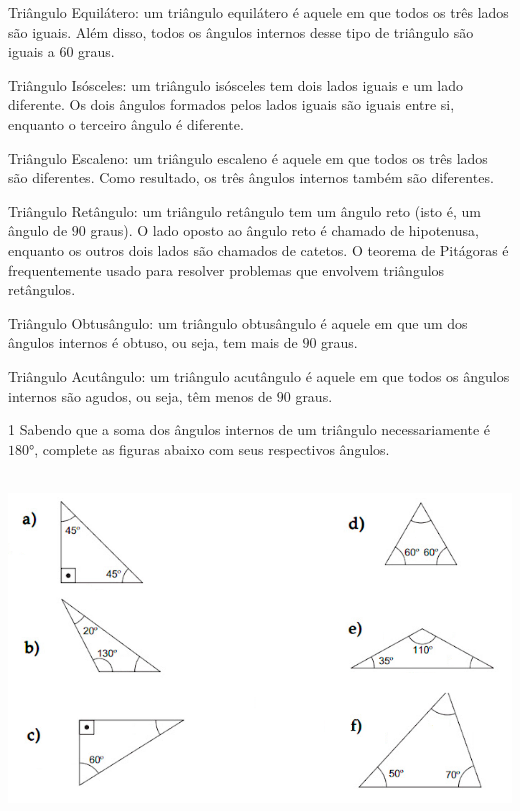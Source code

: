 Triângulo Equilátero: um triângulo equilátero é aquele em que todos os
três lados são iguais. Além disso, todos os ângulos internos desse tipo
de triângulo são iguais a $60$ graus.

Triângulo Isósceles: um triângulo isósceles tem dois lados iguais e um
lado diferente. Os dois ângulos formados pelos lados iguais são iguais
entre si, enquanto o terceiro ângulo é diferente.

Triângulo Escaleno: um triângulo escaleno é aquele em que todos os três
lados são diferentes. Como resultado, os três ângulos internos também
são diferentes.

Triângulo Retângulo: um triângulo retângulo tem um ângulo reto (isto é,
um ângulo de $90$ graus). O lado oposto ao ângulo reto é chamado de
hipotenusa, enquanto os outros dois lados são chamados de catetos. O
teorema de Pitágoras é frequentemente usado para resolver problemas que
envolvem triângulos retângulos.

Triângulo Obtusângulo: um triângulo obtusângulo é aquele em que um dos
ângulos internos é obtuso, ou seja, tem mais de $90$ graus.

Triângulo Acutângulo: um triângulo acutângulo é aquele em que todos os
ângulos internos são agudos, ou seja, têm menos de $90$ graus.


\num{1}  Sabendo que a soma dos ângulos internos de um triângulo
necessariamente é $180$°, complete as figuras abaixo com seus respectivos
ângulos.

\includegraphics[width=5.90625in,height=3.63542in]{./imgSAEB_6_MAT/media/image52.png}

